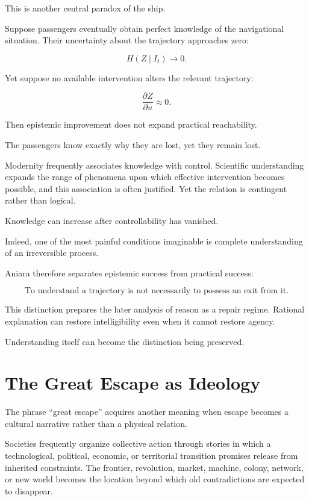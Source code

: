 \documentclass[11pt,oneside]{book}
\theoremstyle{definition}
\theoremstyle{remark}
\begin{document}
This is another central paradox of the ship.

Suppose passengers eventually obtain perfect knowledge of the navigational situation. Their uncertainty about the trajectory approaches zero:

\[
H(Z\mid I_t)\rightarrow0.
\]

Yet suppose no available intervention alters the relevant trajectory:

\[
\frac{\partial Z}{\partial u}\approx0.
\]

Then epistemic improvement does not expand practical reachability.

The passengers know exactly why they are lost, yet they remain lost.

Modernity frequently associates knowledge with control. Scientific understanding expands the range of phenomena upon which effective intervention becomes possible, and this association is often justified. Yet the relation is contingent rather than logical.

Knowledge can increase after controllability has vanished.

Indeed, one of the most painful conditions imaginable is complete understanding of an irreversible process.

Aniara therefore separates epistemic success from practical success:

\[
\boxed{
\text{To understand a trajectory is not necessarily to possess an exit from it.}
}
\]

This distinction prepares the later analysis of reason as a repair regime. Rational explanation can restore intelligibility even when it cannot restore agency.

Understanding itself can become the distinction being preserved.

\section{The Great Escape as Ideology}

The phrase ``great escape'' acquires another meaning when escape becomes a cultural narrative rather than a physical relation.

Societies frequently organize collective action through stories in which a technological, political, economic, or territorial transition promises release from inherited constraints. The frontier, revolution, market, machine, colony, network, or new world becomes the location beyond which old contradictions are expected to disappear.
\end{document}

